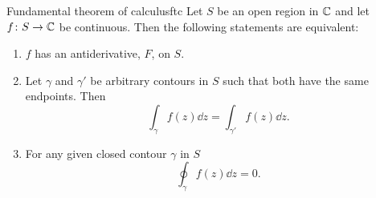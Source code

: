 \documentclass{article}
\begin{document}
    \begin{theorem}{Fundamental theorem of calculus}{ftc}
        Let \(S\) be an open region in \(\mathbb{C}\) and let \(f\colon S\to\mathbb{C}\) be continuous.
        Then the following statements are equivalent:
        \begin{enumerate}
            \item \(f\) has an antiderivative, \(F\), on \(S\).
            \item Let \(\gamma\) and \(\gamma'\) be arbitrary contours in \(S\) such that both have the same endpoints.
            Then
            \[\int_\gamma f(z) \dd{z} = \int_{\gamma'} f(z)\dd{z}.\]
            \item For any given closed contour \(\gamma\) in \(S\)
            \[\oint_{\gamma} f(z) \dd{z} = 0.\]
        \end{enumerate}
    \end{theorem}
\end{document}
